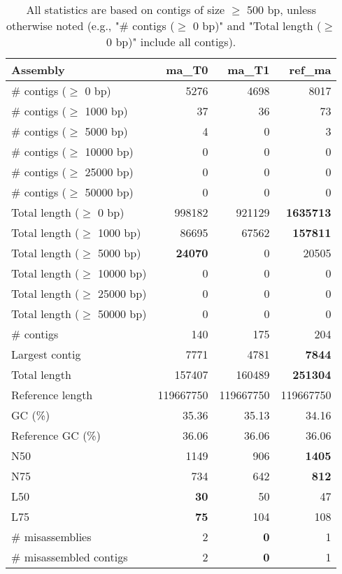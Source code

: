 \documentclass[12pt,a4paper]{article}
\begin{document}
\begin{table}[ht]
\begin{center}
\caption{All statistics are based on contigs of size $\geq$ 500 bp, unless otherwise noted (e.g., "\# contigs ($\geq$ 0 bp)" and "Total length ($\geq$ 0 bp)" include all contigs).}
\begin{tabular}{|l*{3}{|r}|}
\hline
Assembly & ma\_T0 & ma\_T1 & ref\_ma \\ \hline
\# contigs ($\geq$ 0 bp) & 5276 & 4698 & 8017 \\ \hline
\# contigs ($\geq$ 1000 bp) & 37 & 36 & 73 \\ \hline
\# contigs ($\geq$ 5000 bp) & 4 & 0 & 3 \\ \hline
\# contigs ($\geq$ 10000 bp) & 0 & 0 & 0 \\ \hline
\# contigs ($\geq$ 25000 bp) & 0 & 0 & 0 \\ \hline
\# contigs ($\geq$ 50000 bp) & 0 & 0 & 0 \\ \hline
Total length ($\geq$ 0 bp) & 998182 & 921129 & {\bf 1635713} \\ \hline
Total length ($\geq$ 1000 bp) & 86695 & 67562 & {\bf 157811} \\ \hline
Total length ($\geq$ 5000 bp) & {\bf 24070} & 0 & 20505 \\ \hline
Total length ($\geq$ 10000 bp) & 0 & 0 & 0 \\ \hline
Total length ($\geq$ 25000 bp) & 0 & 0 & 0 \\ \hline
Total length ($\geq$ 50000 bp) & 0 & 0 & 0 \\ \hline
\# contigs & 140 & 175 & 204 \\ \hline
Largest contig & 7771 & 4781 & {\bf 7844} \\ \hline
Total length & 157407 & 160489 & {\bf 251304} \\ \hline
Reference length & 119667750 & 119667750 & 119667750 \\ \hline
GC (\%) & 35.36 & 35.13 & 34.16 \\ \hline
Reference GC (\%) & 36.06 & 36.06 & 36.06 \\ \hline
N50 & 1149 & 906 & {\bf 1405} \\ \hline
N75 & 734 & 642 & {\bf 812} \\ \hline
L50 & {\bf 30} & 50 & 47 \\ \hline
L75 & {\bf 75} & 104 & 108 \\ \hline
\# misassemblies & 2 & {\bf 0} & 1 \\ \hline
\# misassembled contigs & 2 & {\bf 0} & 1 \\ \hline

\end{tabular}
\end{center}
\end{table}
\end{document}
